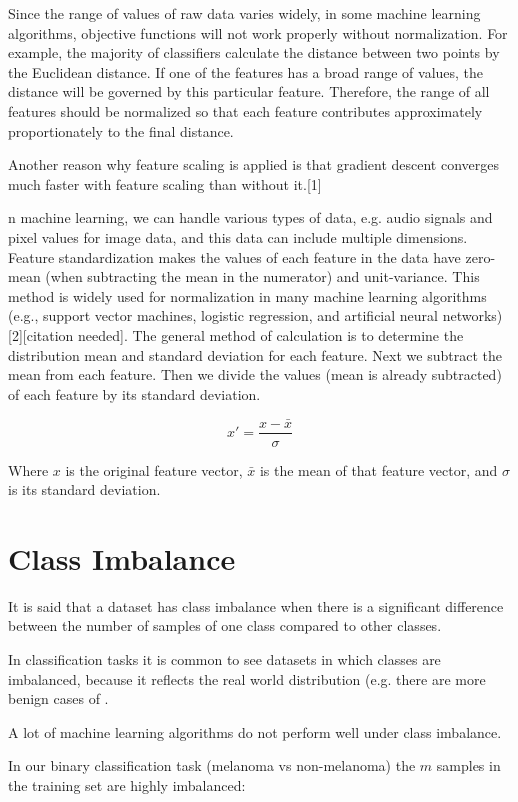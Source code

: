 Since the range of values of raw data varies widely, in some machine learning algorithms, objective functions will not work properly without normalization. For example, the majority of classifiers calculate the distance between two points by the Euclidean distance. If one of the features has a broad range of values, the distance will be governed by this particular feature. Therefore, the range of all features should be normalized so that each feature contributes approximately proportionately to the final distance.

Another reason why feature scaling is applied is that gradient descent converges much faster with feature scaling than without it.[1]

n machine learning, we can handle various types of data, e.g. audio signals and pixel values for image data, and this data can include multiple dimensions. Feature standardization makes the values of each feature in the data have zero-mean (when subtracting the mean in the numerator) and unit-variance. This method is widely used for normalization in many machine learning algorithms (e.g., support vector machines, logistic regression, and artificial neural networks)[2][citation needed]. The general method of calculation is to determine the distribution mean and standard deviation for each feature. Next we subtract the mean from each feature. Then we divide the values (mean is already subtracted) of each feature by its standard deviation.

$$
x' = \frac{x - \bar{x}}{\sigma}
$$

Where $x$ is the original feature vector, $\bar{x}$ is the mean of that feature vector, and $\sigma$ is its standard deviation.

\section{Class Imbalance}
\label{subsection:classimbalance}

It is said that a dataset has class imbalance when there is a significant difference between the number of samples of one class compared to other classes.

In classification tasks it is common to see datasets in which classes are imbalanced, because it reflects the real world distribution (e.g. there are more benign cases of .

A lot of machine learning algorithms do not perform well under class imbalance.

In our binary classification task (melanoma vs non-melanoma) the $m$ samples in the training set are highly imbalanced:

